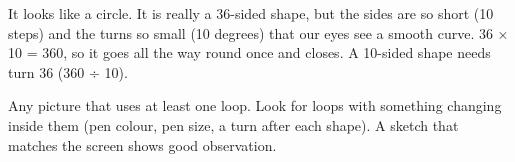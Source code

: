 \begin{answer}
It looks like a circle. It is really a 36-sided shape, but the sides are so short (10 steps) and the turns so small (10 degrees) that our eyes see a smooth curve. 36 × 10 = 360, so it goes all the way round once and closes.
A 10-sided shape needs turn 36 (360 ÷ 10).
\end{answer}

\begin{answer}
Any picture that uses at least one loop. Look for loops with something changing inside them (pen colour, pen size, a turn after each shape). A sketch that matches the screen shows good observation.
\end{answer}
